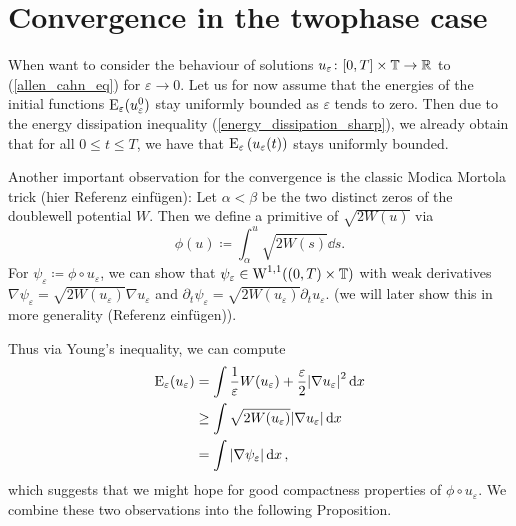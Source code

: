 \section{Convergence in the twophase case}

When want to consider the behaviour of solutions $ u_{ \varepsilon} \colon [0, 
T] \times \operatorname{\mathbb{T}} \to \mathbb{ R } $ to (\ref{allen_cahn_eq}) for $ 
\varepsilon \to 0 $. Let us for now assume that the energies of the initial 
functions $ \operatorname{E}_{ \varepsilon } ( u_{ \varepsilon }^{ 0 } ) $ stay 
uniformly bounded as $ \varepsilon $ tends to zero. 
Then due to the energy dissipation inequality (\ref{energy_dissipation_sharp}), we already obtain that for all
$ 0 \leq t \leq T $, we have that $ \operatorname{E}_{ \varepsilon } \left( u_{\varepsilon } ( t ) \right) $ stays uniformly  bounded.

Another important observation for the convergence is the classic Modica Mortola 
trick (hier Referenz einfügen): Let $ \alpha < \beta $ be the two distinct 
zeros of the doublewell potential $ W $.
Then we define a primitive of $ \sqrt{ 2 W ( u ) } $ via
\begin{equation*}
	\phi ( u ) 
	\coloneqq
	\int_{ \alpha }^{ u }
	\sqrt{ 2 W ( s ) }
	\dd{ s }.
\end{equation*}
For $ \psi_{ \varepsilon } \coloneqq \phi \circ u_{ \varepsilon } $, we can show that $ \psi_{ \varepsilon } \in \operatorname{W}^{ 1, 1 } ( ( 0 , T ) \times \operatorname{\mathbb{T}} ) $ with weak derivatives $ \nabla \psi_{ \varepsilon } = \sqrt{ 2 W ( u_{ \varepsilon } ) } \nabla u_{ \varepsilon } $ and $ \partial_{ t } \psi_{ \varepsilon } = \sqrt{ 2 W ( u_{ \varepsilon } ) } \partial_{ t } u_{ \varepsilon } $. (we will later show this in more generality (Referenz einfügen)).

Thus via Young's inequality, we can compute
\begin{align}
	\operatorname{E}_{ \varepsilon } ( u_{ \varepsilon } )
	& =
	\int
	\frac{ 1 }{ \varepsilon }
	W ( u_{ \varepsilon } ) 
	+
	\frac{ \varepsilon }{ 2 }
	\abs{ \nabla u_{ \varepsilon } }^{ 2 }
	\dd{ x }
	\notag
	\\
	& \geq
	\int
	\sqrt{ 2 W ( u_{ \varepsilon } ) }
	\abs{ \nabla u_{ \varepsilon } }
	\dd{ x }
	\notag
	\\
	& =
	\int
	\abs{ \nabla \psi_{ \varepsilon} }
	\dd{ x }
	\label{modica_mortula_trick},
\end{align}
which suggests that we might hope for good compactness properties of $ \phi \circ u_{ \varepsilon } $.
We combine these two observations into the following Proposition.

